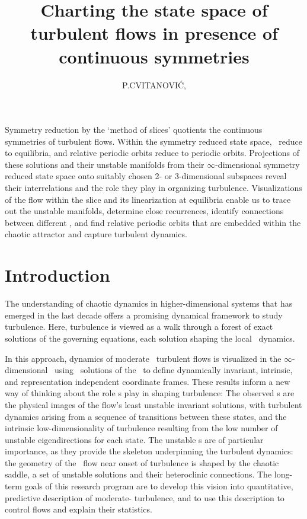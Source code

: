 \documentclass{jfm}
\title[Charting the state space of turbulent flows]
{Charting the state space of turbulent flows
 in presence of continuous symmetries}
\author[P.\ Cvitanovi{\'c}]
{
P.\ns C\ls V\ls I\ls T\ls A\ls N\ls O\ls V\ls I\ls \'C,
}
\affiliation{
 School of Physics,
 Georgia Institute of Technology,
 Atlanta, GA  30332, USA
}
\begin{document}
\maketitle

Symmetry reduction by the `method of slices'
quotients the continuous symmetries of turbulent flows. Within the
symmetry reduced state space, \reqva\ reduce to
equilibria, and relative periodic orbits reduce to periodic orbits.
Projections of these solutions and their unstable manifolds from their
$\infty$-dimensional symmetry reduced state space onto suitably chosen 2-
or 3-dimensional subspaces reveal their interrelations and the role they
play in organizing turbulence. Visualizations
of the flow within the slice and its linearization at equilibria enable
us to trace out the unstable manifolds, determine close recurrences,
identify connections between different \reqva, and
find relative periodic orbits that
are embedded within the chaotic attractor and capture turbulent dynamics.

\section{Introduction}
\label{s:intro}

The understanding of chaotic dynamics in higher-dimensional systems that
has emerged in the last decade offers a promising dynamical framework to
study turbulence. Here, turbulence is viewed as a walk through a forest
of exact solutions of the governing equations, each solution shaping the
local \statesp\ dynamics.

In this approach, dynamics of moderate \Reynolds\ turbulent flows is
visualized in the $\infty$-dimensional \stateDsp\  using \eqv\ solutions
of the \NSe\ to define dynamically invariant, intrinsic, and
representation independent coordinate frames.
These results inform a new way of thinking about the role {\recurrStr s}
play in shaping turbulence:
The observed {\cohStr s} are the physical images of the flow's
least unstable invariant solutions, with
turbulent dynamics arising from a sequence of transitions between
these states, and
the intrinsic low-dimensionality of turbulence resulting from the low
number of unstable eigendirections for each state.
The unstable \po s are of particular
importance, as they provide the skeleton underpinning the
turbulent dynamics: the geometry of the \statesp\ flow
near onset of turbulence is shaped by the chaotic saddle, a set of
unstable solutions and their heteroclinic connections.
The long-term goals of this research program are to develop this vision
into quantitative,  predictive description of moderate-{\Reynolds}
turbulence, and to use this description to control flows and explain their statistics.
\end{document}
